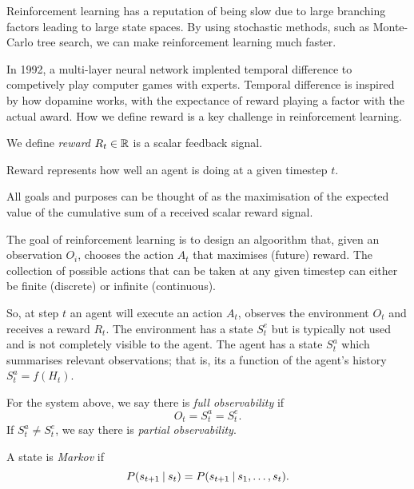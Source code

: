 Reinforcement learning has a reputation of being slow due to large branching
factors leading to large state spaces.
By using stochastic methods, such as Monte-Carlo tree search, we can make
reinforcement learning much faster.

In 1992, a multi-layer neural network implented temporal difference to
competively play computer games with experts.
Temporal difference is inspired by how dopamine works, with the expectance
of reward playing a factor with the actual award.
How we define reward is a key challenge in reinforcement learning.

\begin{definition}[Reward]
	We define \emph{reward} $R_t \in \mathbb{R}$ is a scalar feedback signal.
\end{definition}

Reward represents how well an agent is doing at a given timestep $t$.

\begin{definition}
	All goals and purposes can be thought of as the maximisation of the
	expected value of the cumulative sum of a received scalar reward signal.
\end{definition}

The goal of reinforcement learning is to design an algoorithm that, given an 
observation $O_i$, chooses the action $A_t$ that maximises (future) reward.
The collection of possible actions that can be taken at any given timestep
can either be finite (discrete) or infinite (continuous).

So, at step $t$ an agent will execute an action $A_t$, observes the
environment $O_t$ and receives a reward $R_t$.
The environment has a state $S^e_t$ but is typically not used and
is not completely visible to the agent.
The agent has a state $S^a_t$ which summarises relevant observations; that is,
its a function of the agent's history $S^a_t = f(H_t)$.

\begin{definition}[Observability]
	For the system above, we say there is \emph{full observability} if
	\[
		O_t = S^a_t = S^e_t.
	\]
	If $S^a_t \neq S^e_t$, we say there is \emph{partial observability}.
\end{definition}

\begin{definition}
	A state is \emph{Markov} if
	\[
		P(s_{t+1} \:\vert\: s_t) = P(s_{t+1} \:\vert\: s_1, \ldots, s_t).
	\]
\end{definition}

